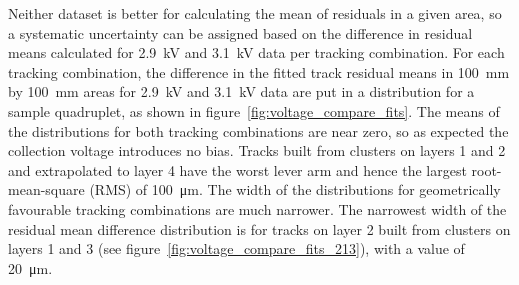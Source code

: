 Neither dataset is better for calculating the mean of residuals in a given area, so a systematic uncertainty can be assigned based on the difference in residual means calculated for 2.9~kV and 3.1~kV data per tracking combination. For each tracking combination, the difference in the fitted track residual means in \SI{100}{mm} by \SI{100}{mm} areas for 2.9~kV and 3.1~kV data are put in a distribution for a sample quadruplet, as shown in figure~\ref{fig:voltage_compare_fits}. The means of the distributions for both tracking combinations are near zero, so as expected the collection voltage introduces no bias. Tracks built from clusters on layers 1 and 2 and extrapolated to layer 4 have the worst lever arm and hence the largest root-mean-square (RMS) of \SI{100}{\micro\meter}. The width of the distributions for geometrically favourable tracking combinations are much narrower. The narrowest width of the residual mean difference distribution is for tracks on layer 2 built from clusters on layers 1 and 3 (see figure~\ref{fig:voltage_compare_fits_213}), with a value of \SI{20}{\micro\meter}.


